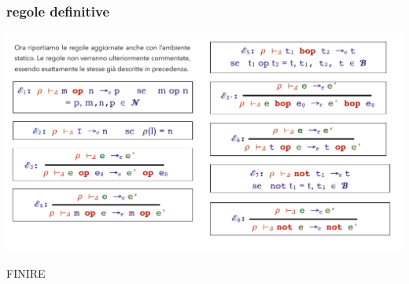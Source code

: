 \documentclass[a4paper, 10pt]{report}
\begin{document}
\subsubsection*{regole definitive}
\begin{center}
\includegraphics[scale=0.8]{2.pdf}
\end{center}

FINIRE
\end{document}

